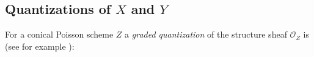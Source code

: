 \documentclass[12pt]{amsart}
\begin{document}
	
	

	
	
\subsection{Quantizations of $X$ and $Y$} 
For a conical Poisson scheme $Z$ a {\it graded quantization} of the structure sheaf  $\mathcal{O}_{Z}$ is (see for example \cite[Section 2.2]{Losevwallcrossing}): 
 
\end{document}
